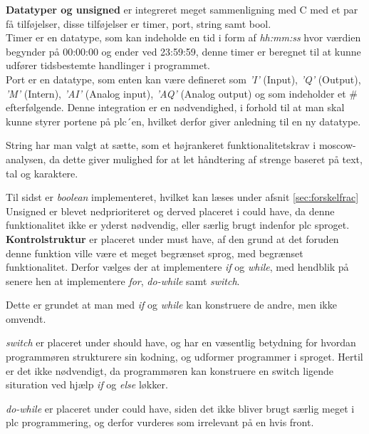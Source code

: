 \noindent\textbf{Datatyper og unsigned}
er integreret meget sammenligning med C med et par få tilføjelser, disse tilføjelser er timer, port, string samt bool.\\
Timer er en datatype, som kan indeholde en tid i form af \textit{hh:mm:ss} hvor værdien begynder på 00:00:00 og ender ved 23:59:59, denne timer er beregnet til at kunne udfører tidsbestemte handlinger i programmet.\\
Port er en datatype, som enten kan være defineret som \textit{'I'} (Input), \textit{'Q'} (Output), \textit{'M'} (Intern), \textit{'AI'} (Analog input), \textit{'AQ'} (Analog output) og som indeholder et \# efterfølgende. Denne integration er en nødvendighed, i forhold til at man skal kunne styrer portene på \gls{plc}´en, hvilket derfor giver anledning til en ny datatype.

String har man valgt at sætte, som et højrankeret funktionalitetskrav i \gls{moscow}-analysen, da dette giver mulighed for at let håndtering af strenge baseret på text, tal og karaktere. 

Til sidst er \textit{boolean} implementeret, hvilket kan læses under afsnit \ref{sec:forskelfrac}\\
Unsigned er blevet nedprioriteret og derved placeret i could have, da denne funktionalitet ikke er yderst nødvendig, eller særlig brugt indenfor \gls{plc} sproget.\\

\noindent\textbf{Kontrolstruktur}
er placeret under must have, af den grund at det foruden denne funktion ville være et meget begrænset sprog, med begrænset funktionalitet.
Derfor vælges der at implementere \textit{if} og \textit{while}, med hendblik på senere hen at implementere \textit{for}, \textit{do-while} samt \textit{switch}.

Dette er grundet at man med \textit{if} og \textit{while} kan konstruere de andre, men ikke omvendt.

\textit{switch} er placeret under should have, og har en væsentlig betydning for hvordan programmøren strukturere sin kodning, og udformer programmer i sproget.
Hertil er det ikke nødvendigt, da programmøren kan konstruere en switch ligende situration ved hjælp \textit{if} og \textit{else} løkker. 

\textit{do-while} er placeret under could have, siden det ikke bliver brugt særlig meget i \gls{plc} programmering, og derfor vurderes som irrelevant på en hvis front.\\

